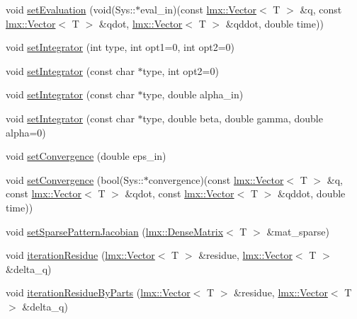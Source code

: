 \begin{DoxyCompactItemize}
\item 
void \hyperlink{classlmx_1_1DiffProblemSecond_a771ce07f6f05c7d92998887af61c1faa}{set\-Evaluation} (void(Sys\-::$\ast$eval\-\_\-in)(const \hyperlink{classlmx_1_1Vector}{lmx\-::\-Vector}$<$ T $>$ \&q, const \hyperlink{classlmx_1_1Vector}{lmx\-::\-Vector}$<$ T $>$ \&qdot, \hyperlink{classlmx_1_1Vector}{lmx\-::\-Vector}$<$ T $>$ \&qddot, double time))
\item 
void \hyperlink{classlmx_1_1DiffProblemSecond_a524e3b2e067de9404b99581f9a6f51aa}{set\-Integrator} (int type, int opt1=0, int opt2=0)
\item 
void \hyperlink{classlmx_1_1DiffProblemSecond_acc8b271e3ed6582fa122f723663efc81}{set\-Integrator} (const char $\ast$type, int opt2=0)
\item 
void \hyperlink{classlmx_1_1DiffProblemSecond_a8a382a9849a8ceb06bee87ea0842af35}{set\-Integrator} (const char $\ast$type, double alpha\-\_\-in)
\item 
void \hyperlink{classlmx_1_1DiffProblemSecond_a3e6d19313d1c5be77b761c8822553829}{set\-Integrator} (const char $\ast$type, double beta, double gamma, double alpha=0)
\item 
void \hyperlink{classlmx_1_1DiffProblemSecond_a860157afdde2ff3987346d20f8974dcb}{set\-Convergence} (double eps\-\_\-in)
\item 
void \hyperlink{classlmx_1_1DiffProblemSecond_a35f7d66e02aec70e4224d51710aa66fe}{set\-Convergence} (bool(Sys\-::$\ast$convergence)(const \hyperlink{classlmx_1_1Vector}{lmx\-::\-Vector}$<$ T $>$ \&q, const \hyperlink{classlmx_1_1Vector}{lmx\-::\-Vector}$<$ T $>$ \&qdot, const \hyperlink{classlmx_1_1Vector}{lmx\-::\-Vector}$<$ T $>$ \&qddot, double time))
\item 
void \hyperlink{classlmx_1_1DiffProblemSecond_adae3bb6c6e7dd3762a66ff4bbed44016}{set\-Sparse\-Pattern\-Jacobian} (\hyperlink{classlmx_1_1DenseMatrix}{lmx\-::\-Dense\-Matrix}$<$ T $>$ \&mat\-\_\-sparse)
\item 
void \hyperlink{classlmx_1_1DiffProblemSecond_ad3cd7fbf7ae65da6b2930e9317c33078}{iteration\-Residue} (\hyperlink{classlmx_1_1Vector}{lmx\-::\-Vector}$<$ T $>$ \&residue, \hyperlink{classlmx_1_1Vector}{lmx\-::\-Vector}$<$ T $>$ \&delta\-\_\-q)
\item 
void \hyperlink{classlmx_1_1DiffProblemSecond_a6f70e77038bde24fbf7e145b9fd68d11}{iteration\-Residue\-By\-Parts} (\hyperlink{classlmx_1_1Vector}{lmx\-::\-Vector}$<$ T $>$ \&residue, \hyperlink{classlmx_1_1Vector}{lmx\-::\-Vector}$<$ T $>$ \&delta\-\_\-q)
\item 

\end{DoxyCompactItemize}

